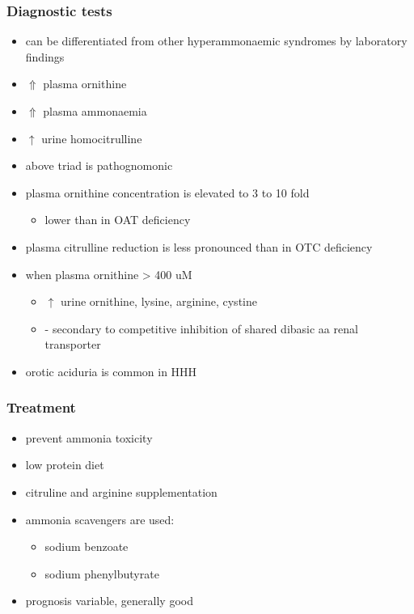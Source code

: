 \documentclass{scrartcl}
\begin{document}
\subsubsection{Diagnostic tests}
\label{sec:org5d6df23}
\begin{itemize}
\item can be differentiated from other hyperammonaemic syndromes by laboratory findings
\item \(\Uparrow\) plasma ornithine
\item \(\Uparrow\) plasma ammonaemia
\item \(\uparrow\) urine homocitrulline
\item above triad is pathognomonic
\item plasma ornithine concentration is elevated to 3 to 10 fold
\begin{itemize}
\item lower than in OAT deficiency
\end{itemize}
\item plasma citrulline reduction is less pronounced than in OTC
deficiency
\item when plasma ornithine \textgreater{} 400 uM
\begin{itemize}
\item \(\uparrow\) urine ornithine, lysine, arginine, cystine
\item - secondary to competitive inhibition of shared dibasic aa renal transporter
\end{itemize}
\item orotic aciduria is common in HHH
\end{itemize}

\subsubsection{Treatment}
\label{sec:org25be1d5}
\begin{itemize}
\item prevent ammonia toxicity
\item low protein diet
\item citruline and arginine supplementation
\item ammonia scavengers are used:
\begin{itemize}
\item sodium benzoate
\item sodium phenylbutyrate
\end{itemize}
\item prognosis variable, generally good
\end{itemize}
\end{document}
